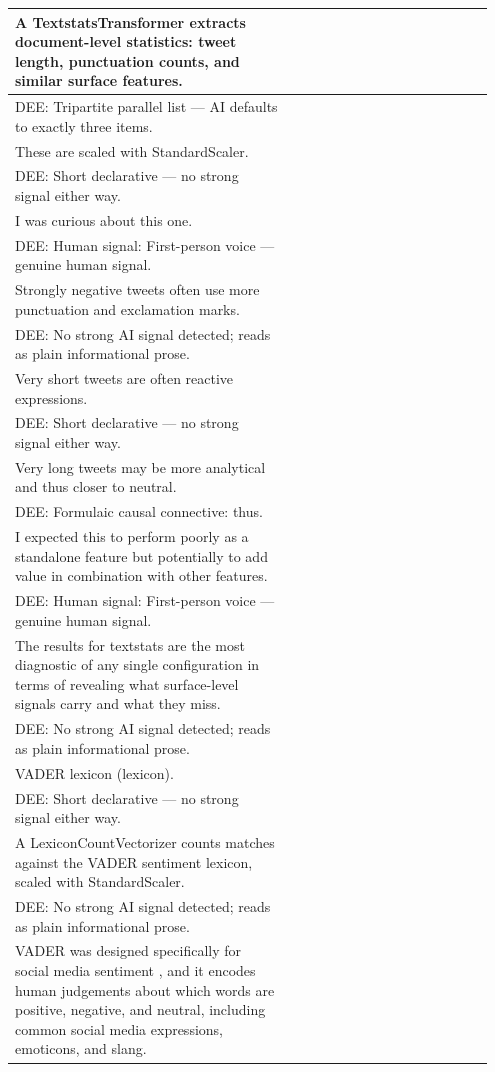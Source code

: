 \documentclass[11pt]{article}
\begin{document}
\begin{longtable}{|p{0.55\linewidth}|p{0.40\linewidth}|}
A TextstatsTransformer extracts document-level statistics: tweet length, punctuation counts, and similar surface features. & \\[2pt]
\hline
DEE: Tripartite parallel list --- AI defaults to exactly three items. & \\
\hline
These are scaled with StandardScaler. & \\[2pt]
\hline
DEE: Short declarative --- no strong signal either way. & \\
\hline
I was curious about this one. & \\[2pt]
\hline
DEE: Human signal: First-person voice --- genuine human signal. & \\
\hline
Strongly negative tweets often use more punctuation and exclamation marks. & \\[2pt]
\hline
DEE: No strong AI signal detected; reads as plain informational prose. & \\
\hline
Very short tweets are often reactive expressions. & \\[2pt]
\hline
DEE: Short declarative --- no strong signal either way. & \\
\hline
Very long tweets may be more analytical and thus closer to neutral. & \\[2pt]
\hline
DEE: Formulaic causal connective: thus. & \\
\hline
I expected this to perform poorly as a standalone feature but potentially to add value in combination with other features. & \\[2pt]
\hline
DEE: Human signal: First-person voice --- genuine human signal. & \\
\hline
The results for textstats are the most diagnostic of any single configuration in terms of revealing what surface-level signals carry and what they miss. & \\[2pt]
\hline
DEE: No strong AI signal detected; reads as plain informational prose. & \\
\hline
VADER lexicon (lexicon). & \\[2pt]
\hline
DEE: Short declarative --- no strong signal either way. & \\
\hline
A LexiconCountVectorizer counts matches against the VADER sentiment lexicon, scaled with StandardScaler. & \\[2pt]
\hline
DEE: No strong AI signal detected; reads as plain informational prose. & \\
\hline
VADER was designed specifically for social media sentiment , and it encodes human judgements about which words are positive, negative, and neutral, including common social media expressions, emoticons, and slang. & \\[2pt]

\end{longtable}
\end{document}
